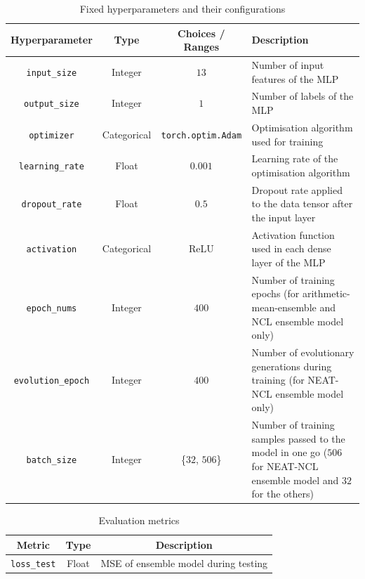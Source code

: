 \begin{table}[H]
    \centering
    \begin{tabular}{|c|c|c|p{5cm}|}
        \hline
        Hyperparameter & Type & Choices / Ranges & Description \\
        \hline
        \small\texttt{input\_size} & Integer & $13$ & Number of input features of the MLP \\
        \hline
        \small\texttt{output\_size} & Integer & $1$ & Number of labels of the MLP \\
        \hline
        \small\texttt{optimizer} & Categorical & \texttt{torch.optim.Adam} & Optimisation algorithm used for training \\
        \hline
        \small\texttt{learning\_rate} & Float & $0.001$ & Learning rate of the optimisation algorithm \\
        \hline
        \small\texttt{dropout\_rate} & Float & $0.5$ & Dropout rate applied to the data tensor after the input layer \\
        \hline
        \small\texttt{activation} & Categorical & ReLU & Activation function used in each dense layer of the MLP \\
        \hline
        \small\texttt{epoch\_nums} & Integer & $400$ & Number of training epochs (for arithmetic-mean-ensemble and NCL ensemble model only) \\
        \hline
        \small\texttt{evolution\_epoch} & Integer & $400$ & Number of evolutionary generations during training (for NEAT-NCL ensemble model only) \\
        \hline
        \small\texttt{batch\_size} & Integer & \{$32$, $506$\} & Number of training samples passed to the model in one go ($506$ for NEAT-NCL ensemble model and $32$ for the others) \\
        \hline
    \end{tabular}
    \caption{Fixed hyperparameters and their configurations}
    \label{table:experiment_5_fixed_hyperparameters}
\end{table}

\begin{table}[H]
    \centering
    \begin{tabular}{|c|c|c|}
        \hline
        Metric & Type & Description \\
        \hline
        \small\texttt{loss\_test} & Float & MSE of ensemble model during testing \\
        \hline
    \end{tabular}
    \caption{Evaluation metrics}
    \label{table:experiment_5_metric}
\end{table}


